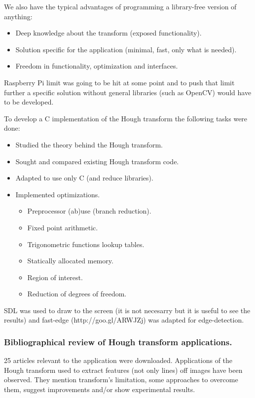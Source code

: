 We also have the typical advantages of programming a library-free version of anything:
\begin{itemize}
	\item Deep knowledge about the transform (exposed functionality).
	\item Solution specific for the application (minimal, fast, only what is needed).
	\item Freedom in functionality, optimization and interfaces.
\end{itemize}

Raspberry Pi limit was going to be hit at some point and to push that limit further a specific solution without general libraries (such as OpenCV) would have to be developed.

To develop a C implementation of the Hough transform the following tasks were done:

\begin{itemize}
	\item Studied the theory behind the Hough transform.
	\item Sought and compared existing Hough transform code.
	\item Adapted to use only C (and reduce libraries).
	\item Implemented optimizations.
	\begin{itemize}
		\item Preprocessor (ab)use (branch reduction).
		\item Fixed point arithmetic.
		\item Trigonometric functions lookup tables.
		\item Statically allocated memory.
		\item Region of interest.
		\item Reduction of degrees of freedom.
	\end{itemize}
\end{itemize}

SDL was used to draw to the screen (it is not necesarry but it is useful to see the results) and fast-edge (http://goo.gl/ARWJZj) was adapted for edge-detection.


\subsubsection{Bibliographical review of Hough transform applications.}
25 articles relevant to the application were downloaded. Applications of the Hough transform used to extract features (not only lines) off images have been observed. They mention transform's limitation, some approaches to overcome them, suggest improvements and/or show experimental results.

